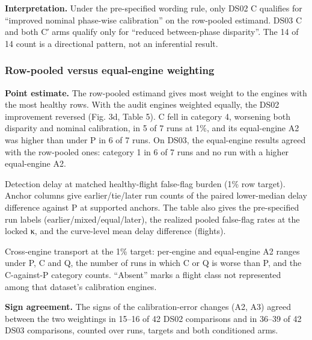 \documentclass[preprint,11pt,a4paper]{elsarticle}
\begin{document}
\textbf{Interpretation.} Under the pre-specified wording rule, only DS02 C qualifies for ``improved nominal phase-wise calibration'' on the row-pooled estimand. DS03 C and both C′ arms qualify only for ``reduced between-phase disparity''. The 14 of 14 count is a directional pattern, not an inferential result.

\subsubsection{Row-pooled versus equal-engine weighting}

\textbf{Point estimate.} The row-pooled estimand gives most weight to the engines with the most healthy rows. With the audit engines weighted equally, the DS02 improvement reversed (Fig. 3d, Table 5). C fell in category 4, worsening both disparity and nominal calibration, in 5 of 7 runs at 1\%, and its equal-engine A2 was higher than under P in 6 of 7 runs. On DS03, the equal-engine results agreed with the row-pooled ones: category 1 in 6 of 7 runs and no run with a higher equal-engine A2.
\begin{table}[htbp]
\centering
\small
\caption{Detection delay at matched healthy-flight false-flag burden (1\% row target). Anchor columns give earlier/tie/later run counts of the paired lower-median delay difference against P at supported anchors. The table also gives the pre-specified run labels (earlier/mixed/equal/later), the realized pooled false-flag rates at the locked κ, and the curve-level mean delay difference (flights).}
\label{tab:4}
\begin{adjustbox}{max width=\textwidth}

\end{adjustbox}
\end{table}
\begin{table}[htbp]
\centering
\small
\caption{Cross-engine transport at the 1\% target: per-engine and equal-engine A2 ranges under P, C and Q, the number of runs in which C or Q is worse than P, and the C-against-P category counts. ``Absent'' marks a flight class not represented among that dataset's calibration engines.}
\label{tab:5}
\begin{adjustbox}{max width=\textwidth}

\end{adjustbox}
\end{table}

\textbf{Sign agreement.} The signs of the calibration-error changes (A2, A3) agreed between the two weightings in 15–16 of 42 DS02 comparisons and in 36–39 of 42 DS03 comparisons, counted over runs, targets and both conditioned arms.
\end{document}

